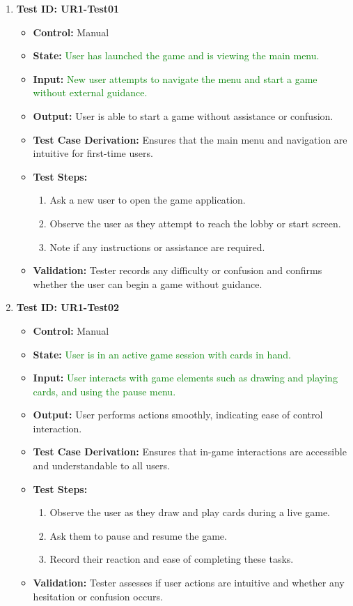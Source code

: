 \documentclass[12pt]{article}
\newcommand{\added}[1]{\textcolor{green}{#1}}
\begin{document}
\begin{enumerate}
    \item \textbf{Test ID: UR1-Test01}
    \begin{itemize}
        \item \textbf{Control:} Manual
        \item \textbf{State:} \added{User has launched the game and is viewing the main menu.}
        \item \textbf{Input:} \added{New user attempts to navigate the menu and start a game without external guidance.}
        \item \textbf{Output:} User is able to start a game without assistance or confusion.
        \item \textbf{Test Case Derivation:} Ensures that the main menu and navigation are intuitive for first-time users.
        \item \textbf{Test Steps:}
        \begin{enumerate}
            \item Ask a new user to open the game application.
            \item Observe the user as they attempt to reach the lobby or start screen.
            \item Note if any instructions or assistance are required.
        \end{enumerate}
        \item \textbf{Validation:} Tester records any difficulty or confusion and confirms whether the user can begin a game without guidance.
    \end{itemize}

    \item \textbf{Test ID: UR1-Test02}
    \begin{itemize}
        \item \textbf{Control:} Manual
        \item \textbf{State:} \added{User is in an active game session with cards in hand.}
        \item \textbf{Input:} \added{User interacts with game elements such as drawing and playing cards, and using the pause menu.}
        \item \textbf{Output:} User performs actions smoothly, indicating ease of control interaction.
        \item \textbf{Test Case Derivation:} Ensures that in-game interactions are accessible and understandable to all users.
        \item \textbf{Test Steps:}
        \begin{enumerate}
            \item Observe the user as they draw and play cards during a live game.
            \item Ask them to pause and resume the game.
            \item Record their reaction and ease of completing these tasks.
        \end{enumerate}
        \item \textbf{Validation:} Tester assesses if user actions are intuitive and whether any hesitation or confusion occurs.
    \end{itemize}
\end{enumerate}
\end{document}

